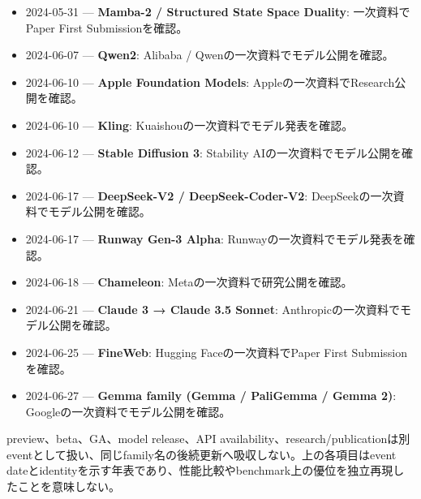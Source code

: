 \begin{itemize}[leftmargin=1.5em,itemsep=0.25em]
\item 2024-05-31 — \textbf{Mamba-2 / Structured State Space Duality}: 一次資料でPaper First Submissionを確認。 \autocite{src-0cba3ed32188}
\item 2024-06-07 — \textbf{Qwen2}: Alibaba / Qwenの一次資料でモデル公開を確認。 \autocite{src-461ae12066d1}
\item 2024-06-10 — \textbf{Apple Foundation Models}: Appleの一次資料でResearch公開を確認。 \autocite{src-c89d38f0e830}
\item 2024-06-10 — \textbf{Kling}: Kuaishouの一次資料でモデル発表を確認。 \autocite{src-9c32b95d27a7}
\item 2024-06-12 — \textbf{Stable Diffusion 3}: Stability AIの一次資料でモデル公開を確認。 \autocite{src-7b3484ead314}
\item 2024-06-17 — \textbf{DeepSeek-V2 / DeepSeek-Coder-V2}: DeepSeekの一次資料でモデル公開を確認。 \autocite{src-d9d69089eb6a}
\item 2024-06-17 — \textbf{Runway Gen-3 Alpha}: Runwayの一次資料でモデル発表を確認。 \autocite{src-b881d1321d94}
\item 2024-06-18 — \textbf{Chameleon}: Metaの一次資料で研究公開を確認。 \autocite{src-e1259b3c0804}
\item 2024-06-21 — \textbf{Claude 3 → Claude 3.5 Sonnet}: Anthropicの一次資料でモデル公開を確認。 \autocite{src-e91e6f80eaac}
\item 2024-06-25 — \textbf{FineWeb}: Hugging Faceの一次資料でPaper First Submissionを確認。 \autocite{src-51631a225b70}
\item 2024-06-27 — \textbf{Gemma family (Gemma / PaliGemma / Gemma 2)}: Googleの一次資料でモデル公開を確認。 \autocite{src-0395647db4a8}
\end{itemize}

preview、beta、GA、model release、API availability、research/publicationは別eventとして扱い、同じfamily名の後続更新へ吸収しない。上の各項目はevent dateとidentityを示す年表であり、性能比較やbenchmark上の優位を独立再現したことを意味しない。
